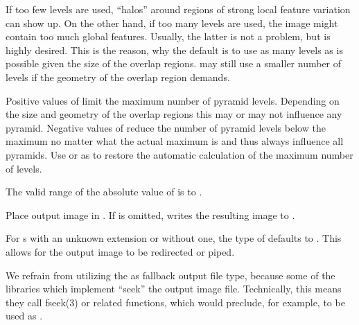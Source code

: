 \begin{codelist}
\begin{geeknote}
    If too few levels are used, ``halos'' around regions of strong local feature variation can
    show up.  On the other hand, if too many levels are used, the image might contain too much
    global features.  Usually, the latter is not a problem, but is highly desired.  This is the
    reason, why the default is to use as many levels as is possible given the size of the
    overlap regions.  \App{} may still use a smaller number of levels if the geometry of the
    overlap region demands.
  \end{geeknote}

  Positive values of  limit the maximum number of pyramid levels.  Depending on
  the size and geometry of the overlap regions this may or may not influence any pyramid.
  Negative values of  reduce the number of pyramid levels below the maximum no
  matter what the actual maximum is and thus always influence all pyramids.  Use 
  or  as  to restore the automatic calculation of the maximum
  number of levels.

  The valid range of the absolute value of  is 
  to .

  \label{opt:output}%
\item[\itempar{-o \metavar{FILE} \\ --output=\metavar{FILE}}]\itemend
  Place \appdid{} output image in .  If  is omitted, \App{}
  writes the resulting image to .

  For s with an unknown extension or without one, the type of 
  defaults to .  This allows for the output
  image to be redirected or piped.

  \begin{geeknote}
    We refrain from utilizing the  as fallback output file type, because some of
    the libraries which implement  ``seek'' the output image file.  Technically,
    this means they call fseek(3) or related functions, which would preclude, for example,
     to be used as .


\end{geeknote}
\end{codelist}
